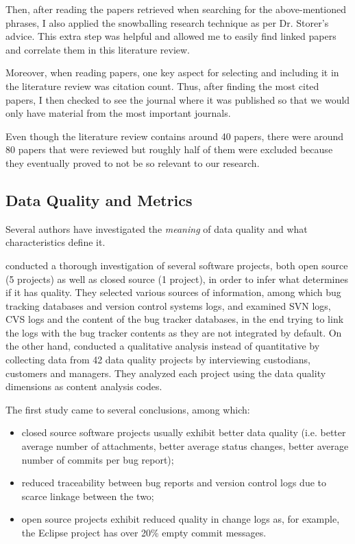 \documentclass{mprop}
\begin{document}
Then, after reading the papers retrieved when searching for the above-mentioned
phrases, I also applied the snowballing research technique as per Dr. Storer's 
advice. This extra step was helpful and allowed me to easily find linked 
papers and correlate them in this literature review.

Moreover, when reading papers, one key aspect for selecting and including it
in the literature review was citation count. Thus, after finding the most 
cited papers, I then checked to see the journal where it was published so that
we would only have material from the most important journals.

Even though the literature review contains around 40 papers, there were
around 80 papers that were reviewed but roughly half of them were excluded 
because they eventually proved to not be so relevant to our research. 

\subsection{Data Quality and Metrics}

Several authors have investigated the \emph{meaning} of data quality and
what characteristics define it.

\citet{bachmann2009software} conducted a thorough investigation of several
software projects, both open source (5 projects) as well as closed source (1 
project), in order to infer what determines if it has quality. They selected 
various sources of information, among which bug tracking 
databases and version control systems logs, and examined SVN logs, CVS logs
and the content of the bug tracker databases, in the end trying to link 
the logs with the bug tracker contents as they are not integrated by default. 
On the other hand, \citet{strong1997data} conducted a qualitative analysis
instead of quantitative by collecting data from 42 data quality projects by 
interviewing custodians, customers and managers. They analyzed each project
using the data quality dimensions as content analysis codes.

The first study came to several conclusions, among which:
  \begin{itemize}
    \item closed source software projects usually exhibit better data quality 
    (i.e. better average number of attachments, better average status changes, 
    better average number of commits per bug report);
    \item reduced traceability between bug reports and version control logs
    due to scarce linkage between the two;
    \item open source projects exhibit reduced quality in change logs as,
    for example, the Eclipse project has over 20\% empty commit messages.
  \end{itemize}
\end{document}
